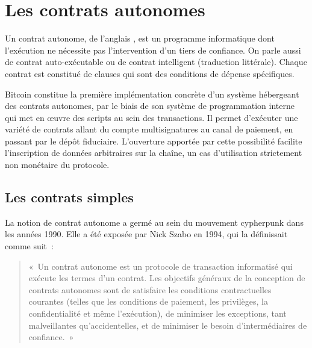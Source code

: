 
\chapter{Les contrats autonomes}
\label{ch:contrats}

Un contrat autonome, de l'anglais , est un programme informatique dont l'exécution ne nécessite pas l'intervention d'un tiers de confiance. On parle aussi de contrat auto-exécutable ou de contrat intelligent (traduction littérale). Chaque contrat est constitué de clauses qui sont des conditions de dépense spécifiques.

Bitcoin constitue la première implémentation concrète d'un système hébergeant des contrats autonomes, par le biais de son système de programmation interne qui met en œuvre des scripts au sein des transactions. Il permet d'exécuter une variété de contrats allant du compte multisignatures au canal de paiement, en passant par le dépôt fiduciaire. L'ouverture apportée par cette possibilité facilite l'inscription de données arbitraires sur la chaîne, un cas d'utilisation strictement non monétaire du protocole.

\section*{Les contrats simples}

La notion de contrat autonome a germé au sein du mouvement cypherpunk dans les années 1990. Elle a été exposée par Nick Szabo en 1994, qui la définissait comme suit~:

\begin{quote}
«~Un contrat autonome est un protocole de transaction informatisé qui exécute les termes d'un contrat. Les objectifs généraux de la conception de contrats autonomes sont de satisfaire les conditions contractuelles courantes (telles que les conditions de paiement, les privilèges, la confidentialité et même l'exécution), de minimiser les exceptions, tant malveillantes qu'accidentelles, et de minimiser le besoin d'intermédiaires de confiance.~»
\end{quote} %

